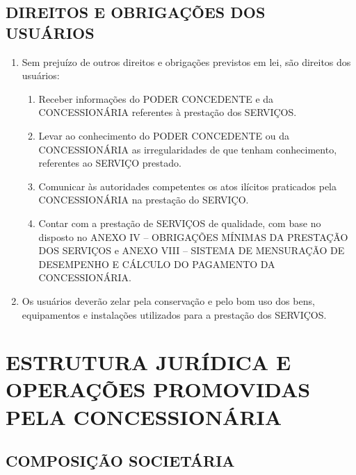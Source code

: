 \documentclass[a4paper,11pt]{report} %
\begin{document}
\section{DIREITOS E OBRIGAÇÕES DOS USUÁRIOS}
\label{sec:C3PG}

\begin{enumerate}
\item \label{itm:FT82} Sem prejuízo de outros direitos e obrigações previstos em lei, são direitos dos usuários:

\begin{enumerate}[label*=\arabic*.]
\item \label{itm:JAXX} Receber informações do PODER CONCEDENTE e da CONCESSIONÁRIA referentes à prestação dos SERVIÇOS.

\item \label{itm:MW7S} Levar ao conhecimento do PODER CONCEDENTE ou da CONCESSIONÁRIA as irregularidades de que tenham conhecimento, referentes ao SERVIÇO prestado.

\item \label{itm:QDTB} Comunicar às autoridades competentes os atos ilícitos praticados pela CONCESSIONÁRIA na prestação do SERVIÇO.

\item \label{itm:GJFV} Contar com a prestação de SERVIÇOS de qualidade, com base no disposto no ANEXO IV – OBRIGAÇÕES MÍNIMAS DA PRESTAÇÃO DOS SERVIÇOS e ANEXO VIII – SISTEMA DE MENSURAÇÃO DE DESEMPENHO E CÁLCULO DO PAGAMENTO DA CONCESSIONÁRIA.
\end{enumerate}

\item \label{itm:5HKP} Os usuários deverão zelar pela conservação e pelo bom uso dos bens, equipamentos e instalações utilizados para a prestação dos SERVIÇOS.
\end{enumerate}

\chapter{ESTRUTURA JURÍDICA E OPERAÇÕES PROMOVIDAS PELA CONCESSIONÁRIA}
\section{COMPOSIÇÃO SOCIETÁRIA}
\label{sec:DVV7}
\end{document}
